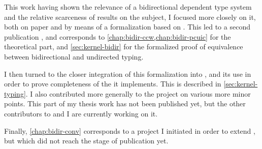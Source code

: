 This work having shown the relevance of a bidirectional dependent type system and the relative
scarceness of results on the subject, I focused more closely on it, both on
paper and by means of a formalization based on . This led to a second publication
, and corresponds to \cref{chap:bidir-ccw,chap:bidir-pcuic}
for the theoretical part, and \cref{sec:kernel-bidir} for the formalized proof
of equivalence between bidirectional and undirected typing.

I then turned to the closer integration of this formalization into , and its use
in order to prove completeness of the  it implements.%
This is described in \cref{sec:kernel-typing}.
I also contributed more generally to the project on various more minor points.
This part of my thesis work has not been published yet, but the other contributors to
 and I are currently working on it.

Finally, \cref{chap:bidir-conv} corresponds to a project I initiated in order to extend
, but which did not reach the stage of publication yet.